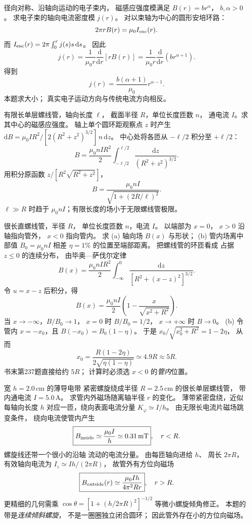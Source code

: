 径向对称、沿轴向运动的电子束内，
磁感应强度模满足
$B(r)=br^\alpha$，
$b,\alpha>0$。
求电子束的轴向电流密度模 $j(r)$。
\exsolution
对以束轴为中心的圆形安培环路：
\[
2\pi r B(r)=\mu_0 I_{\rm enc}(r).
\]
而
$I_{\rm enc}(r)=2\pi\int_0^rj(s)s\,\mathrm ds$。
因此
\[
j(r)=\frac1{\mu_0r}
\frac{\mathrm d}{\mathrm dr}[rB(r)]
=\frac1{\mu_0r}\frac{\mathrm d}{\mathrm dr}
(br^{\alpha+1}).
\]
得到
\[
\boxed{j(r)=\frac{b(\alpha+1)}{\mu_0}
r^{\alpha-1}}.
\]
\excheck 本题求大小；
真实电子运动方向与传统电流方向相反。

有限长单层螺线管，轴向长度 $\ell$，
截面半径 $R$，单位长度匝数 $n$，
通电流 $I$。求其中心的磁感应强度。
\exsolution
轴上单个圆环距观察点 $z$ 时产生
$\mathrm dB=\mu_0 IR^2/
[2(R^2+z^2)^{3/2}]\,n\,\mathrm dz$。
中心处将各匝从
$-\ell/2$ 积分至 $+\ell/2$：
\[
B=\frac{\mu_0nIR^2}{2}
\int_{-\ell/2}^{\ell/2}
\frac{\mathrm dz}{(R^2+z^2)^{3/2}}.
\]
用积分原函数
$z/[R^2\sqrt{R^2+z^2}]$，
\[
\boxed{B=
\frac{\mu_0nI}{\sqrt{1+(2R/\ell)^2}}}.
\]
\excheck $\ell\gg R$ 时趋于
$\mu_0nI$；有限长度的场小于无限螺线管极限。

很长直螺线管，半径 $R$，
单位长度匝数 $n$，电流 $I$。
以端部为 $x=0$，
$x>0$ 沿轴指向管外，
$x<0$ 指向管内。
求 (a) 轴向场 $B(x)$ 与形状；
(b) 管内场离中部值
$B_0=\mu_0nI$ 相差 $\eta=1\%$
的位置至端部距离。
\exsolution
把螺线管的环匝看成
占据 $z\le0$ 的连续分布，
由毕奥—萨伐尔定律
\[
B(x)=\frac{\mu_0nIR^2}{2}
\int_{-\infty}^{0}
\frac{\mathrm dz}{[R^2+(x-z)^2]^{3/2}}.
\]
令 $u=x-z$ 后积分，得
\[
\boxed{B(x)=\frac{\mu_0nI}{2}
\left(1-\frac{x}{\sqrt{x^2+R^2}}\right)}.
\]
当 $x\to-\infty$，$B/B_0\to1$，
$x=0$ 时 $B/B_0=1/2$，
$x\to+\infty$ 时 $B\to0$。
(b) 令管内 $x=-x_0$，且
$B(-x_0)=B_0(1-\eta)$。
于是
$x_0/\sqrt{x_0^2+R^2}=1-2\eta$，
从而
\[
\boxed{x_0=
\frac{R(1-2\eta)}
{2\sqrt{\eta(1-\eta)}}
\simeq4.9R\approx5R}.
\]
\excheck 书末第237题直接给约 $5R$；
计算时必须选 $x<0$ 的\emph{管内}位置。

宽 $h=2.0\,\mathrm{cm}$ 的薄导电带
紧密螺旋绕成半径
$R=2.5\,\mathrm{cm}$ 的很长单层螺线管，
带内通电流 $I=5.0\,\mathrm A$。
求管内外磁场随离轴半径 $r$ 的变化。
\exsolution
薄带紧密盘绕，近似每轴向长度 $h$
对应一匝，绕向表面电流分量
$K_\varphi\simeq I/h$。
由无限长电流片磁场跳变条件，
绕向电流使管内产生
\[
\boxed{B_{\rm inside}\simeq
\frac{\mu_0 I}{h}\simeq0.31\,\mathrm{mT}},
\quad r<R.
\]
螺旋线还带一个很小的沿轴
流动的电流分量。
由每匝轴向进给 $h$、
周长 $2\pi R$，
有效轴向电流为
$I_z\simeq I h/(2\pi R)$，
故管外有方位向磁场
\[
\boxed{B_{\rm outside}(r)\simeq
\frac{\mu_0 I h}{4\pi^2Rr}},\quad r>R.
\]
更精细的几何需乘
$\cos\theta=
[1+(h/2\pi R)^2]^{-1/2}$
等微小螺旋倾角修正。
\excheck 本题的带是\emph{连续倾斜螺旋}，
不是一圈圈独立闭合圆环；
因此管外存在小的方位向磁场。

